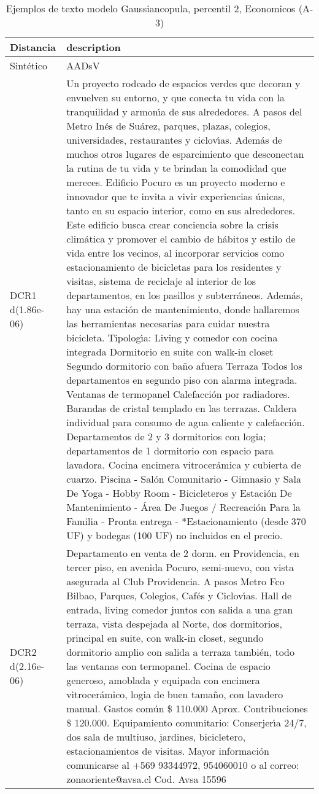\begin{table}[H]
\centering
\fontsize{10}{14}\selectfont
\caption{Ejemplos de texto modelo Gaussiancopula, percentil 2, Economicos (A-3)}
\label{table-example-economicos-a-3-gaussiancopula-2p-text}
\begin{tabular}{|l|m{35em}|}
\hline
\rowcolor[gray]{0.8}
Distancia & description \\
\hline Sintético & AADsV \\
\hline DCR1 d(1.86e-06) & Un proyecto rodeado de espacios verdes que decoran y envuelven su entorno, y que conecta tu vida con la tranquilidad y armon{\'\i}a de sus alrededores. A pasos del Metro In\'es de Su\'arez, parques, plazas, colegios, universidades, restaurantes y ciclov{\'\i}as. Adem\'as de muchos otros lugares de esparcimiento que desconectan la rutina de tu vida y te brindan la comodidad que mereces.  Edificio Pocuro es un proyecto moderno e innovador que te invita a vivir experiencias \'unicas, tanto en su espacio interior, como en sus alrededores. Este edificio busca crear conciencia sobre la crisis clim\'atica y promover el cambio de h\'abitos y estilo de vida entre los vecinos, al incorporar servicios como estacionamiento de bicicletas para los residentes y visitas, sistema de reciclaje al interior de los departamentos, en los pasillos y subterr\'aneos. Adem\'as, hay una estaci\'on de mantenimiento, donde hallaremos las herramientas necesarias para cuidar nuestra bicicleta.   Tipolog{\'\i}a: Living y comedor con cocina integrada  Dormitorio en suite con walk-in closet Segundo dormitorio con ba\~no afuera Terraza   Todos los departamentos en segundo piso con alarma integrada. Ventanas de termopanel Calefacci\'on por radiadores. Barandas de cristal templado en las terrazas. Caldera individual para consumo de agua caliente y calefacci\'on. Departamentos de 2 y 3 dormitorios con logia; departamentos de 1 dormitorio con espacio para lavadora. Cocina encimera vitrocer\'amica y cubierta de cuarzo.  Piscina - Sal\'on Comunitario - Gimnasio y Sala De Yoga - Hobby Room - Bicicleteros y Estaci\'on De Mantenimiento - \'Area De Juegos / Recreaci\'on Para la Familia   - Pronta entrega -  *Estacionamiento (desde 370 UF) y bodegas (100 UF) no incluidos en el precio. \\
\hline DCR2 d(2.16e-06) & Departamento en venta de 2 dorm. en Providencia, en tercer piso, en avenida Pocuro, semi-nuevo, con vista asegurada al Club Providencia. A pasos Metro Fco Bilbao, Parques, Colegios, Caf\'es y Ciclov{\'\i}as. Hall de entrada, living comedor juntos con salida a una gran terraza, vista despejada al Norte, dos dormitorios, principal en suite, con walk-in closet, segundo dormitorio amplio con salida a terraza tambi\'en, todo las ventanas con termopanel. Cocina de espacio generoso, amoblada y equipada con encimera vitrocer\'amico, logia de buen tama\~no, con lavadero manual. Gastos com\'un \$ 110.000 Aprox. Contribuciones \$ 120.000. Equipamiento comunitario: Conserjer{\'\i}a 24/7, dos sala de multiuso, jardines, bicicletero, estacionamientos de visitas. Mayor informaci\'on comunicarse al +569 93344972, 954060010 o al correo: zonaoriente@avsa.cl Cod. Avsa 15596 \\
\hline
\end{tabular}
\end{table}
